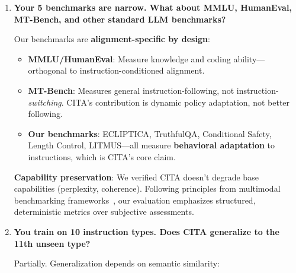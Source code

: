 \begin{enumerate}[label=\textbf{Q\arabic*.}, leftmargin=*, itemsep=8pt]
\textbf{Key differentiator}: RLHF produces a fixed policy. Changing alignment behavior requires retraining. CITA enables runtime policy switching via instructions---a capability RLHF cannot provide without architectural changes.

\vspace{4mm}

\item \textbf{Your 5 benchmarks are narrow. What about MMLU, HumanEval, MT-Bench, and other standard LLM benchmarks?}

 Our benchmarks are \textbf{alignment-specific by design}:

\begin{itemize}[leftmargin=*,itemsep=2pt]
    \item \textbf{MMLU/HumanEval}: Measure knowledge and coding ability---orthogonal to instruction-conditioned alignment.

    \item \textbf{MT-Bench}: Measures general instruction-following, not instruction-\textit{switching}. CITA's contribution is dynamic policy adaptation, not better following.

    \item \textbf{Our benchmarks}: ECLIPTICA, TruthfulQA, Conditional Safety, Length Control, LITMUS---all measure \textbf{behavioral adaptation} to instructions, which is CITA's core claim.
\end{itemize}

\textbf{Capability preservation}: We verified CITA doesn't degrade base capabilities (perplexity, coherence). Following principles from multimodal benchmarking frameworks~\cite{wanaskar2025multimodal}, our evaluation emphasizes structured, deterministic metrics over subjective assessments.

\vspace{4mm}

\item \textbf{You train on 10 instruction types. Does CITA generalize to the 11th unseen type?}

 Partially. Generalization depends on semantic similarity:


\end{enumerate}
